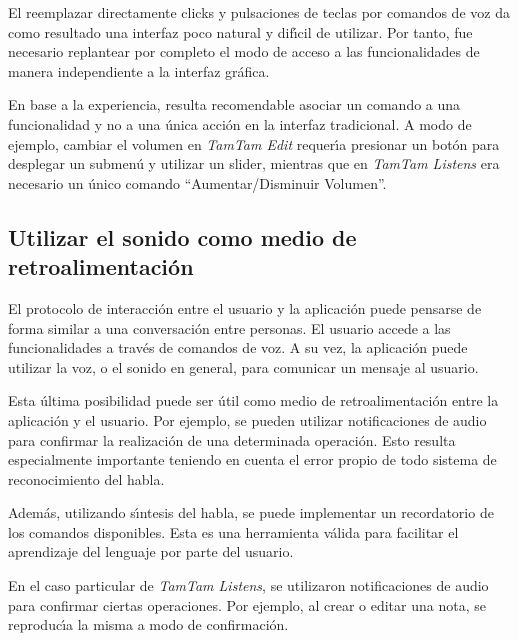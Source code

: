El reemplazar directamente clicks y pulsaciones de teclas por comandos de voz da
como resultado una interfaz poco natural y dif{\'\i}cil de utilizar. Por tanto, fue
necesario replantear por completo el modo de acceso a las funcionalidades de manera
independiente a la interfaz gr\'afica.

En base a la experiencia, resulta recomendable asociar un comando a una funcionalidad
y no a una \'unica acci\'on en la interfaz tradicional. A modo de ejemplo, cambiar el
volumen en \emph{TamTam Edit} requer{\'\i}a presionar un bot\'on para desplegar un submen\'u 
y utilizar un {slider}, mientras que en \emph{TamTam Listens} era necesario un
\'unico comando ``Aumentar/Disminuir Volumen''.

\subsection{Utilizar el sonido como medio de retroalimentaci\'on}
El protocolo de interacci\'on entre el usuario y la aplicaci\'on puede pensarse de forma similar a una 
conversaci\'on entre personas. El usuario accede a las funcionalidades a trav\'es de comandos de voz.
A su vez, la aplicaci\'on puede utilizar la voz, o el sonido en general, para comunicar un mensaje al usuario.

Esta \'ultima posibilidad puede ser \'util como medio de retroalimentaci\'on entre la aplicaci\'on y el usuario.
Por ejemplo, se pueden utilizar notificaciones de audio para confirmar la realizaci\'on de una determinada
operaci\'on. Esto resulta especialmente importante teniendo en cuenta el error propio de todo sistema
de reconocimiento del habla.

Adem\'as, utilizando s{\'\i}ntesis del habla, se puede implementar un recordatorio de los comandos
disponibles. Esta es una herramienta v\'alida para facilitar el aprendizaje del lenguaje por parte del
usuario.

En el caso particular de \emph{TamTam Listens}, se utilizaron notificaciones de audio para confirmar
ciertas operaciones. Por ejemplo, al crear o editar una nota, se reproduc{\'\i}a la misma a modo de
confirmaci\'on.

